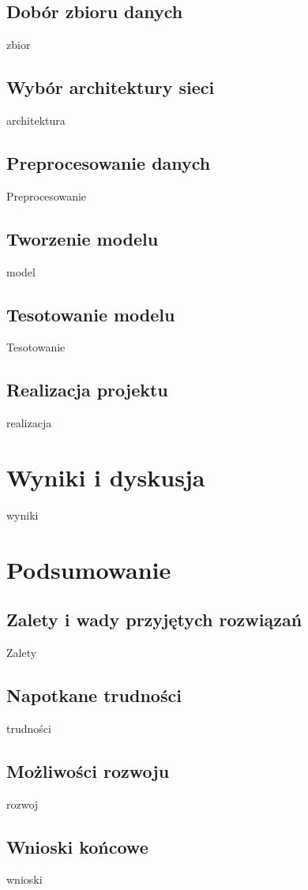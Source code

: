\documentclass[12pt]{article}
\begin{document}
\begin{sloppypar}
{  \subsection{Dobór zbioru danych}
  {
    zbior
  }
  \subsection{Wybór architektury sieci}
  {
    architektura
  }
  \subsection{Preprocesowanie danych}
  {
    Preprocesowanie
  }
  \subsection{Tworzenie modelu}
  {
    model
  }
  \subsection{Tesotowanie modelu}
  {
    Tesotowanie
  }
  \subsection{Realizacja projektu}
  {
    realizacja
  }
}

\section{Wyniki i dyskusja}
{
  wyniki
}

\section{Podsumowanie}
{
  \subsection{Zalety i wady przyjętych rozwiązań}
  {
    Zalety
  }
  \subsection{Napotkane trudności}
  {
    trudności
  }
  \subsection{Możliwości rozwoju}
  {
    rozwoj
  }
  \subsection{Wnioski końcowe}
  {
    wnioski
  }
}

\clearpage
\printbibliography[
  heading=bibintoc,
  title={Bibliografia}
]

\clearpage
\listoffigures

\clearpage
\listoftables

\clearpage
{}
\lstlistoflistings

\end{sloppypar}
\end{document}
